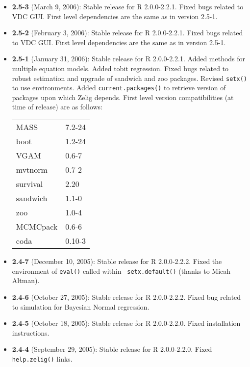 \begin{itemize}
\item {\bf 2.5-3} (March 9, 2006): Stable release for R 2.0.0-2.2.1.  Fixed bugs 
related to VDC GUI.  First level dependencies are the same as in version 2.5-1.  

\item {\bf 2.5-2} (February 3, 2006): Stable release for R 2.0.0-2.2.1.  Fixed bugs 
related to VDC GUI.  First level dependencies are the same as in version 2.5-1.

\item {\bf 2.5-1} (January 31, 2006): Stable release 
for R 2.0.0-2.2.1.  Added methods for multiple equation models.  Added
tobit regression.  Fixed bugs related to robust estimation and upgrade of sandwich and 
zoo packages.  Revised {\tt setx()} to use environments.  Added 
{\tt current.packages()} to retrieve version of packages upon which Zelig 
depends.  First level version compatibilities (at time of release) 
are as follows: \newline
\begin{tabular}{ll}
     MASS       & 7.2-24 \\
     boot       & 1.2-24 \\
     VGAM       & 0.6-7 \\
     mvtnorm    & 0.7-2 \\ 
     survival   & 2.20  \\
     sandwich   & 1.1-0 \\
     zoo        & 1.0-4 \\
     MCMCpack   & 0.6-6 \\
     coda       & 0.10-3 \\
\end{tabular}

\item \textbf{2.4-7} (December 10, 2005): Stable release for R 
2.0.0-2.2.2.  Fixed the environment of {\tt eval()} called within {\tt
  setx.default()} (thanks to Micah Altman).

\item \textbf{2.4-6} (October 27, 2005): Stable release for R 
2.0.0-2.2.2.  Fixed bug related to simulation for Bayesian Normal regression.

\item \textbf{2.4-5} (October 18, 2005): Stable release for R 2.0.0-2.2.0.  
Fixed installation instructions.  

\item \textbf{2.4-4} (September 29, 2005): Stable release for R 
2.0.0-2.2.0.  Fixed {\tt help.zelig()} links.  


\end{itemize}
